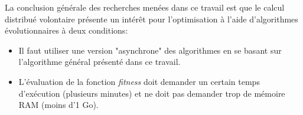 \documentclass[a4paper, 12pt]{report}
\begin{document}
La conclusion générale des recherches menées dans ce travail est que le calcul distribué volontaire présente un intérêt pour l'optimisation à l'aide d'algorithmes évolutionnaires à deux conditions:
\begin{itemize}
\item Il faut utiliser une version "asynchrone" des algorithmes en se basant sur l'algorithme général présenté dans ce travail.
\item L'évaluation de la fonction \textit{fitness} doit demander un certain temps d'exécution (plusieurs minutes) et ne doit pas demander trop de mémoire RAM (moins d'1 Go).
\end{itemize}


\newpage
\nocite{*}


\end{document}
